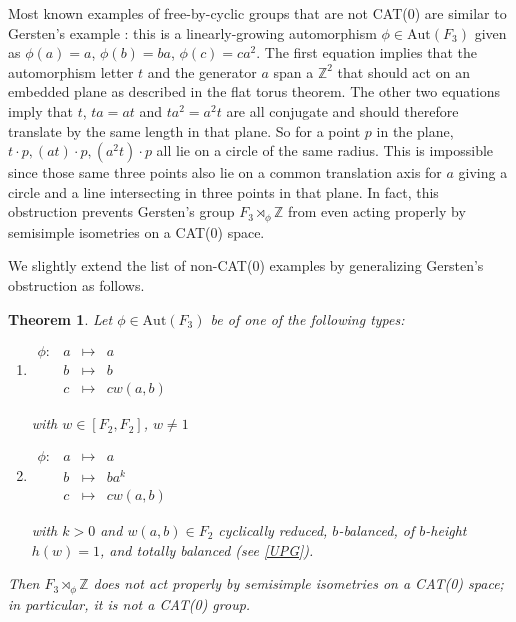 \documentclass  [a4paper, 11pts] {article}
\newtheorem{thm}{Theorem}[section]
\newcommand{\Z}{\mathbb{Z}}
\newcommand{\Aut}{{\mathrm{Aut}}}
\begin{document}
Most known examples of free-by-cyclic groups that are not CAT(0) are similar to Gersten's example \cite{Ger94}: this is a linearly-growing automorphism $\phi\in \Aut(F_3)$ given as $\phi(a) = a$, $\phi(b) = ba$, $\phi(c) = ca^2$. The first equation implies that the automorphism letter $t$ and the generator $a$ span a $\Z^2$ that should act on an embedded plane as described in the flat torus theorem. The other two equations imply that $t$, $ta=at$ and $ta^2=a^2t$ are all conjugate and should therefore translate by the same length in that plane. So for a point $p$ in the plane, $t\cdot p, (at)\cdot p, (a^2t)\cdot p$ all lie on a circle of the same radius. This is impossible since those same three points also lie on a common translation axis for $a$ giving a circle and a line intersecting in three points in that plane. In fact, this obstruction prevents Gersten's group $F_3\rtimes_\phi\Z$ from even acting properly by semisimple isometries on a CAT(0) space.

We slightly extend the list of non-CAT(0) examples by generalizing Gersten's obstruction as follows.

\begin{thm}
\label{NonCAT0}
    Let $\phi\in \Aut(F_3)$ be of one of the following types:
    \begin{enumerate}
        \item $\begin{array}{rccl} \phi: &
            a & \mapsto & a \\
            & b & \mapsto & b \\
            & c & \mapsto & cw(a,b)
            \end{array}$
            
            with $w\in [F_2, F_2]$, $w\ne 1$

        \item $\begin{array}{rccl} \phi: &
            a & \mapsto & a \\
            & b & \mapsto & ba^k \\
            & c & \mapsto & cw(a,b)
            \end{array}$
            
            with $k > 0$ and $w(a,b)\in F_2$ cyclically reduced, $b$-balanced, of $b$-height $h(w) = 1$, and totally balanced (see \ref{UPG}).
    \end{enumerate}
    Then $F_3\rtimes_\phi\Z$ does not act properly by semisimple isometries on a CAT(0) space; in particular, it is not a CAT(0) group.
\end{thm}
\end{document}
